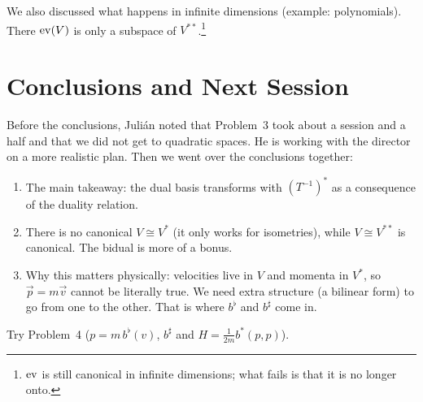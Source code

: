 \documentclass[11pt,a4paper]{article}
\begin{document}
We also discussed what happens in infinite dimensions (example: polynomials). There $\operatorname{ev}(V)$ is only a subspace of $V^{**}$.\footnote{$\operatorname{ev}$ is still canonical in infinite dimensions; what fails is that it is no longer onto.}

\section{Conclusions and Next Session}
\label{sec:conclusions}

Before the conclusions, Juli\'an noted that Problem~3 took about a session and a half and that we did not get to quadratic spaces. He is working with the director on a more realistic plan. Then we went over the conclusions together:

\begin{takeaways}[Conclusions]
  \begin{enumerate}
    \item The main takeaway: the dual basis transforms with $(T^{-1})^*$ as a consequence of the duality relation.
    \item There is no canonical $V\cong V^*$ (it only works for isometries), while $V\cong V^{**}$ is canonical. The bidual is more of a bonus.
    \item Why this matters physically: velocities live in $V$ and momenta in $V^*$, so $\vec p=m\vec v$ cannot be literally true. We need extra structure (a bilinear form) to go from one to the other. That is where $b^\flat$ and $b^\sharp$ come in.
  \end{enumerate}
\end{takeaways}

\begin{nextsession}
  Try Problem~4 ($p=m\,b^\flat(v)$, $b^\sharp$ and $H=\tfrac{1}{2m}b^*(p,p)$).
\end{nextsession}
\end{document}
